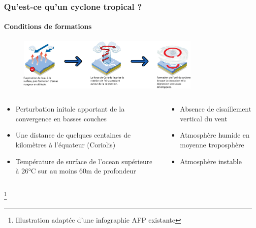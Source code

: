 \documentclass[aspectratio=169, usepdftitle=false, xcolor={dvipsnames}, 9pt,table]{beamer}
\newcommand\blfootnote[1]{%
  \begingroup
  \renewcommand\thefootnote{}\footnote{#1}%
  \addtocounter{footnote}{-1}%
  \endgroup
}
\begin{document}
\begin{frame}[c]
    \frametitle{Qu'est-ce qu'un cyclone tropical ?}
    \framesubtitle{Conditions de formations}
    \begin{figure}[h]
        \centering
        \includegraphics[width=0.8\textwidth]{Figures/diagramme_formation.png}
    \end{figure}
    \footnotesize
    \begin{block}
        \begin{columns}[t]
            \scriptsize
            \begin{column}{0.5\textwidth}
                \begin{itemize}
                   \item Perturbation initale apportant de la convergence en basses couches
                   \item Une distance de quelques centaines de kilomètres à l'équateur (Coriolis)
                   \item Température de surface de l'ocean supérieure à 26°C sur au moins 60m de profondeur \parencite{palmen_formation_1948}
                \end{itemize}
            \end{column}
            \begin{column}{0.5\textwidth}
               \begin{itemize}
                   \item Absence de cisaillement vertical du vent\\\parencite{gray_global_1968}
                   \item Atmosphère humide en moyenne troposphère
                   \item Atmosphère instable
               \end{itemize} 
            \end{column}
        \end{columns}
    \end{block}
    \blfootnote{Illustration adaptée d'une infographie AFP existante}
\end{frame}
\end{document}
